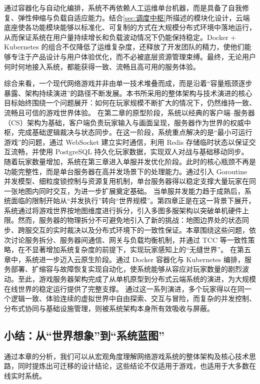 通过容器化与自动化编排，系统不再依赖人工运维单台机器，而是具备了自我修复、弹性伸缩与负载自适应能力。结合\ref{sec:调度中枢}所描述的模块化设计，云端底座使各功能模块能够以标准化、可复制的方式在大规模分布式环境中落地运行，从而保证系统在用户量持续增长和负载波动情况下仍能保持稳定。Docker + Kubernetes 的组合不仅降低了运维复杂度，还释放了开发团队的精力，使他们能够专注于产品设计与用户体验优化，而不必被底层资源管理束缚。最终，无论用户何时何地接入系统，都能获得一致、流畅且高可用的服务体验。

综合来看，一个现代网络游戏并非由单一技术堆叠而成，而是沿着“容量瓶颈逐步暴露、架构持续演进”的路径不断发展。本书所采用的整体架构与技术演进的核心目标始终围绕一个问题展开：如何在玩家规模不断扩大的情况下，仍然维持一致、流畅且可信的游戏世界体验。
在第二章的原型阶段，系统以经典的客户端–服务器（CS）架构为基础，客户端负责玩家输入与画面呈现，服务器作为世界的权威中枢，完成基础逻辑裁决与状态同步。在这一阶段，系统重点解决的是“最小可运行游戏”的问题，通过 WebSocket 建立实时通信，利用 Redis 存储临时状态以保证交互流畅，并使用 PostgreSQL 持久化玩家数据，实现双人对战与基础移动同步。
随着玩家数量增加，系统在第三章进入单服并发优化阶段。此时的核心瓶颈不再是功能完整性，而是单台服务器在高并发场景下的处理能力。通过引入 Goroutine 并发模型、细粒度锁控制与资源复用机制，单台服务器得以稳定支撑大量玩家在同一张地图内同时交互，为进一步扩展奠定基础。
当单服并发能力趋于成熟后，系统面临的限制开始从“并发执行”转向“世界规模”。第四章正是在这一背景下展开，系统通过将游戏世界按地图维度进行拆分，引入多图多服架构以突破单机硬件上限。然而，服务器的物理拆分不可避免地引入了新的挑战：地图边界处的状态同步、跨服交互的实时裁决以及分布式环境下的一致性保证。本章围绕这些问题，依次讨论服务拆分、服务器间通信、网关与负载均衡机制，并通过 TCC 等一致性策略，在不显著增加系统复杂度的前提下，实现玩家感知上的“无缝世界”。
在第五章中，系统进一步迈入云原生阶段。通过 Docker 容器化与 Kubernetes 编排，服务部署、扩缩容与故障恢复实现自动化，使系统能够从容应对玩家数量的剧烈波动。至此，游戏服务器架构完成了从单机原型到分布式云端系统的演进，为大规模在线世界的稳定运行提供了完整支撑。
通过这一系列演进，多个玩家得以在同一个逻辑一致、体验连续的虚拟世界中自由探索、交互与冒险，而复杂的并发控制、分布式协同与基础设施管理，则被系统架构本身所有效吸收与屏蔽。


\subsection{小结：从“世界想象”到“系统蓝图”}

通过本章的分析，我们可以从宏观角度理解网络游戏系统的整体架构及核心技术思路，同时提炼出可迁移的设计结论，这些结论不仅适用于游戏，也适用于大多数在线实时系统。

